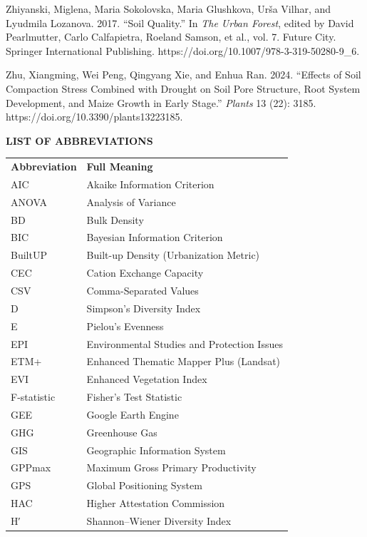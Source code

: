 Zhiyanski, Miglena, Maria Sokolovska, Maria Glushkova, Urša Vilhar, and Lyudmila Lozanova. 2017. ``Soil Quality.'' In \emph{The Urban Forest}, edited by David Pearlmutter, Carlo Calfapietra, Roeland Samson, et al., vol. 7. Future City. Springer International Publishing. https://doi.org/10.1007/978-3-319-50280-9\_6.

Zhu, Xiangming, Wei Peng, Qingyang Xie, and Enhua Ran. 2024. ``Effects of Soil Compaction Stress Combined with Drought on Soil Pore Structure, Root System Development, and Maize Growth in Early Stage.'' \emph{Plants} 13 (22): 3185. https://doi.org/10.3390/plants13223185.

{}\textbf{LIST OF ABBREVIATIONS}

\begin{longtable}[]{@{}
  >{\raggedright\arraybackslash}p{}
  >{\raggedright\arraybackslash}p{}@{}}
\toprule\noalign{}
\endhead
\bottomrule\noalign{}
\endlastfoot
\textbf{Abbreviation} & \textbf{Full Meaning} \\
AIC & Akaike Information Criterion \\
ANOVA & Analysis of Variance \\
BD & Bulk Density \\
BIC & Bayesian Information Criterion \\
BuiltUP & Built-up Density (Urbanization Metric) \\
CEC & Cation Exchange Capacity \\
CSV & Comma-Separated Values \\
D & Simpson's Diversity Index \\
E & Pielou's Evenness \\
EPI & Environmental Studies and Protection Issues \\
ETM+ & Enhanced Thematic Mapper Plus (Landsat) \\
EVI & Enhanced Vegetation Index \\
F-statistic & Fisher's Test Statistic \\
GEE & Google Earth Engine \\
GHG & Greenhouse Gas \\
GIS & Geographic Information System \\
GPPmax & Maximum Gross Primary Productivity \\
GPS & Global Positioning System \\
HAC & Higher Attestation Commission \\
H′ & Shannon--Wiener Diversity Index \\

\end{longtable}

